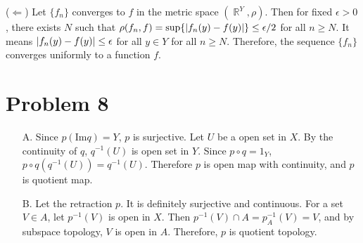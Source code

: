 \documentclass{article}
\DeclareMathOperator{\rr}{\mathbb{R}}
\DeclarePairedDelimiter\abs{\lvert}{\rvert}%
\begin{document}
($\Leftarrow$) Let $\{f_n\}$ converges to $f$ in the metric space $(\rr^Y, \rho)$. Then for fixed $\epsilon>0$, there exists $N$ such that $\rho(f_n, f)=\sup\{\abs{f_n(y)-f(y)}\}\leq \epsilon/2$ for all $n\geq N$. It means $\abs{f_n(y)-f(y)}\leq \epsilon$ for all $y\in Y$ for all $n\geq N$. Therefore, the sequence $\{f_n\}$ converges uniformly to a function $f$.
\section*{Problem 8}
\begin{enumerate}
\item[A.] Since $p(\text{Im}q)=Y$, $p$ is surjective. Let $U$ be a open set in $X$. By the continuity of $q$, $q^{-1}(U)$ is open set in $Y$. Since $p\circ q=1_Y$, $p\circ q(q^{-1}(U))=q^{-1}(U)$. Therefore $p$ is open map with continuity, and $p$ is quotient map.
\item[B.] Let the retraction $p$. It is definitely surjective and continuous. For a set $V\in A$, let $p^{-1}(V)$ is open in $X$. Then $p^{-1}(V)\cap A=p_{A}^{-1}(V)=V$, and by subspace topology, $V$ is open in $A$. Therefore, $p$ is quotient topology.
\end{enumerate}
\end{document}
